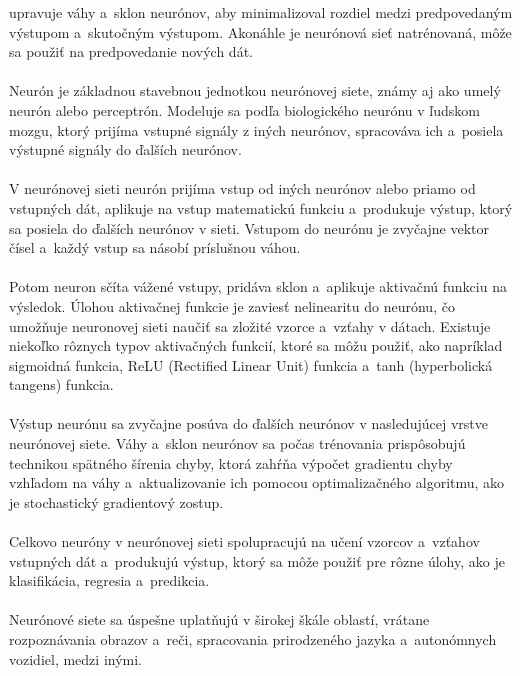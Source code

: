     upravuje váhy a~sklon neurónov, aby minimalizoval rozdiel medzi predpovedaným výstupom a~skutočným výstupom.
    Akonáhle je neurónová sieť natrénovaná, môže sa použiť na predpovedanie nových dát.\\
    \\
    Neurón je základnou stavebnou jednotkou neurónovej siete, známy aj ako umelý neurón alebo perceptrón.
    Modeluje sa podľa biologického neurónu v ľudskom mozgu, ktorý prijíma vstupné signály z iných neurónov,
    spracováva ich a~posiela výstupné signály do ďalších neurónov.\\
    \\
    V neurónovej sieti neurón prijíma vstup od iných neurónov alebo priamo od vstupných dát, aplikuje na vstup
    matematickú funkciu a~produkuje výstup, ktorý sa posiela do ďalších neurónov v sieti. Vstupom do neurónu je
    zvyčajne vektor čísel a~každý vstup sa násobí príslušnou váhou.\\
    \\
    Potom neuron sčíta vážené vstupy, pridáva sklon a~aplikuje aktivačnú funkciu na výsledok. Úlohou aktivačnej
    funkcie je zaviesť nelinearitu do neurónu, čo umožňuje neuronovej sieti naučiť sa zložité vzorce a~vzťahy v dátach.
    Existuje niekoľko rôznych typov aktivačných funkcií, ktoré sa môžu použiť, ako napríklad sigmoidná funkcia,
    ReLU (Rectified Linear Unit) funkcia a~tanh (hyperbolická tangens) funkcia.\\
    \\
    Výstup neurónu sa zvyčajne posúva do ďalších neurónov v nasledujúcej vrstve neurónovej siete. Váhy a~sklon
    neurónov sa počas trénovania prispôsobujú technikou spätného šírenia chyby, ktorá zahŕňa výpočet gradientu chyby
    vzhľadom na váhy a~aktualizovanie ich pomocou optimalizačného algoritmu, ako je stochastický gradientový zostup.\\
    \\
    Celkovo neuróny v neurónovej sieti spolupracujú na učení vzorcov a~vzťahov vstupných dát a~produkujú výstup,
    ktorý sa môže použiť pre rôzne úlohy, ako je klasifikácia, regresia a~predikcia.\\
    \\
    Neurónové siete sa úspešne uplatňujú v širokej škále oblastí, vrátane rozpoznávania obrazov a~reči, spracovania
    prirodzeného jazyka a~autonómnych vozidiel, medzi inými.

